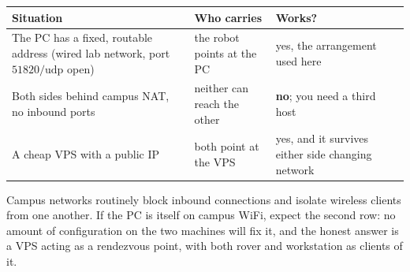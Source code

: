 \begin{center}
\small
\begin{tabular}{@{}L{4.6cm}L{4.4cm}L{4.4cm}@{}}
\toprule
Situation & Who carries  & Works? \\
\midrule
The PC has a fixed, routable address (wired lab network, port
$51820/\mathrm{udp}$ open) & the robot points at the PC & yes, the
arrangement used here \\
\addlinespace
Both sides behind campus NAT, no inbound ports & neither can reach the other
& \textbf{no}; you need a third host \\
\addlinespace
A cheap VPS with a public IP & both point at the VPS & yes, and it survives
either side changing network \\
\bottomrule
\end{tabular}
\end{center}

\noindent Campus networks routinely block inbound connections and isolate
wireless clients from one another. If the PC is itself on campus WiFi, expect
the second row: no amount of configuration on the two machines will fix it,
and the honest answer is a VPS acting as a rendezvous point, with both rover
and workstation as clients of it.

